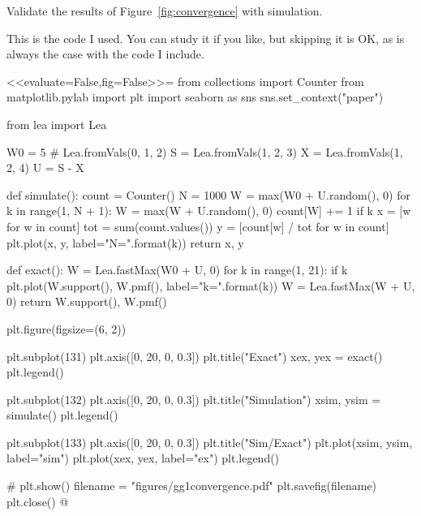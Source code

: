 \begin{question}
  Validate the results of  Figure~\ref{fig:convergence} with simulation.
  \begin{solution}
    This is the code I used. You can study it if you like, but
    skipping it is OK, as is always the case with the code I include.


<<evaluate=False,fig=False>>=
from collections import Counter
from matplotlib.pylab import plt
import seaborn as sns
sns.set_context("paper")

from lea import Lea

W0 = 5  # Lea.fromVals(0, 1, 2)
S = Lea.fromVals(1,  2, 3)
X = Lea.fromVals(1,  2, 4)
U = S - X

def simulate():
    count = Counter()
    N = 1000
    W = max(W0 + U.random(), 0)
    for k in range(1, N + 1):
        W = max(W + U.random(), 0)
        count[W] += 1
        if k %
            x = [w for w in count]
            tot = sum(count.values())
            y = [count[w] / tot for w in count]
            plt.plot(x, y, label="N={}".format(k))
    return x, y


def exact():
    W = Lea.fastMax(W0 + U, 0)
    for k in range(1, 21):
        if k %
            plt.plot(W.support(), W.pmf(), label="k={}".format(k))
        W = Lea.fastMax(W + U, 0)
    return W.support(), W.pmf()


plt.figure(figsize=(6, 2))

plt.subplot(131)
plt.axis([0, 20, 0, 0.3])
plt.title("Exact")
xex, yex = exact()
plt.legend()


plt.subplot(132)
plt.axis([0, 20, 0, 0.3])
plt.title("Simulation")
xsim, ysim = simulate()
plt.legend()

plt.subplot(133)
plt.axis([0, 20, 0, 0.3])
plt.title("Sim/Exact")
plt.plot(xsim, ysim, label="sim")
plt.plot(xex, yex, label="ex")
plt.legend()

# plt.show()
filename = "figures/gg1convergence.pdf"
plt.savefig(filename)
plt.close()
@

\end{solution}
\end{question}


